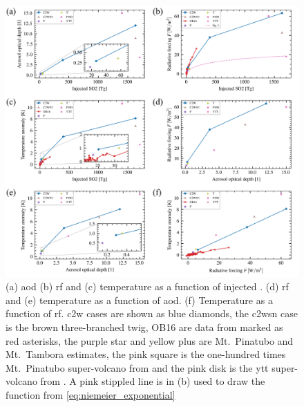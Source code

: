 \documentclass{ametsocV6.1}
\newcommand{\iso}[1][i]{{#1}njected \ce{SO2}}
\begin{document}
\begin{figure}
  \centering
  \includegraphics[width=0.95\linewidth]{figures/parameter_scan.png}

  \caption{(a) \gls{aod} (b) \gls{rf} and (c) temperature as a function of \iso{}\@. (d)
    \gls{rf} and (e) temperature as a function of \gls{aod}. (f) Temperature as a function
    of \gls{rf}. \gls{c2w} cases are shown as blue diamonds, the \gls{c2wsn} case is the
    brown three-branched twig, OB16 are data from \citet{ottobliesner2016} marked as red
    asterisks, the purple star and yellow plus are Mt.\ Pinatubo and Mt.\ Tambora estimates,
    the pink square is the one-hundred times Mt.\ Pinatubo super-volcano from
    \citet{jones2005} and the pink disk is the \gls{ytt} super-volcano from
    \citet{timmreck2010}. A pink stippled line is in (b) used to draw the function from
    \ref{eq:niemeier_exponential}}\label{fig:parameter_scan}%
\end{figure}
\end{document}
